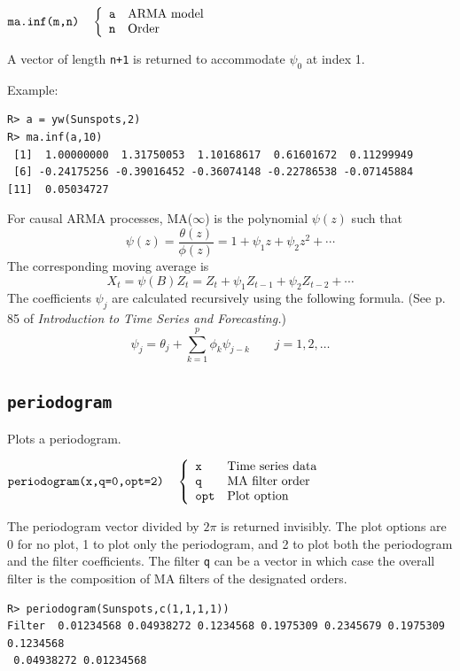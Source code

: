 \documentclass[12pt]{article}
\begin{document}
\bigskip
$
\hbox{\tt ma.inf(m,n)}\quad\left\{\begin{array}{ll}
{\tt a} & \hbox{ARMA model}\\
{\tt n} & \hbox{Order}
\end{array}\right.
$

\bigskip
\noindent
A vector of length {\tt n+1} is returned to accommodate $\psi_0$ at index 1.

\bigskip
\noindent
Example:

\begin{verbatim}
R> a = yw(Sunspots,2)
R> ma.inf(a,10)
 [1]  1.00000000  1.31750053  1.10168617  0.61601672  0.11299949
 [6] -0.24175256 -0.39016452 -0.36074148 -0.22786538 -0.07145884
[11]  0.05034727
\end{verbatim}

\bigskip
\noindent
For causal ARMA processes,
MA($\infty$) is the polynomial $\psi(z)$ such that
\[
\psi(z)=\frac{\theta(z)}{\phi(z)}=1+\psi_1z+\psi_2z^2+\cdots
\]
The corresponding moving average is
\[
X_t=\psi(B)Z_t=Z_t+\psi_1Z_{t-1}+\psi_2Z_{t-2}+\cdots
\]
The coefficients $\psi_j$ are calculated recursively using the following formula.
(See p. 85 of {\it Introduction to Time Series and Forecasting.})
\[
\psi_j=
\theta_j+\sum_{k=1}^p\phi_k\psi_{j-k}\qquad j=1,2,\ldots
\]

\newpage

\subsection{\tt periodogram}
Plots a periodogram.

\bigskip
$
\hbox{\tt periodogram(x,q=0,opt=2)}\quad\left\{\begin{array}{ll}
{\tt x} & \hbox{Time series data}\\
{\tt q} & \hbox{MA filter order}\\
{\tt opt} & \hbox{Plot option}
\end{array}\right.
$

\bigskip
\noindent
The periodogram vector divided by $2\pi$ is returned invisibly.
The plot options are 0 for no plot, 1 to plot only the periodogram,
and 2 to plot both the periodogram and the filter coefficients.
The filter {\tt q} can be a vector in which case the overall filter is the
composition of MA filters of the designated orders.

\begin{verbatim}
R> periodogram(Sunspots,c(1,1,1,1))
Filter  0.01234568 0.04938272 0.1234568 0.1975309 0.2345679 0.1975309 0.1234568
 0.04938272 0.01234568 
\end{verbatim}
\end{document}

